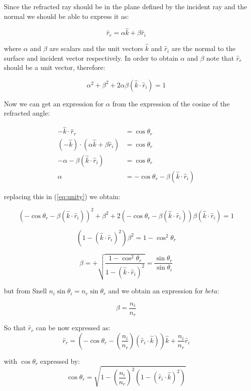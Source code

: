 \documentclass[10pt,a4paper]{article}
\begin{document}
Since the refracted ray should be in the plane defined by the incident ray and the normal we should be able to express it as:

\begin{equation}
\hat r_r = \alpha  \hat k + \beta \hat r_i
\end{equation}

where $\alpha$ and $\beta$ are scalars and the unit vectors $\hat k$ and $\hat r_i$ are the normal to the surface and incident vector respectively.
In order to obtain $\alpha$ and $\beta$ note that $\hat r_r$ should be a unit vector, therefore:

\begin{equation} \label{eq:unity}
\alpha^2 + \beta^2 + 2 \alpha \beta (\hat k \cdot \hat r_i) = 1 
\end{equation}

Now we can get an expression for $\alpha$ from the expression of the cosine of the refracted angle:

\begin{align}
-\hat k \cdot \hat r_r              & = \cos\theta_r \nonumber \\
(-\hat k)\cdot (\alpha \hat k +\beta \hat r_i)  
                                    & = \cos\theta_r \nonumber \\
-\alpha-\beta (\hat k\cdot \hat r_i)           
                                    & = \cos\theta_r \nonumber \\
\alpha                              & 
                           = -\cos\theta_r -\beta(\hat k \cdot \hat r_i) 
\end{align}

replacing this in (\ref{eq:unity}) we obtain:

\[
(- \cos\theta_r - \beta (\hat k \cdot \hat r_i))^2+ \beta^2 + 2(-\cos\theta_r-\beta(\hat k\cdot \hat r_i))\beta(\hat k \cdot \hat r_i)=1
\]

\[
(1-(\hat k\cdot \hat r_i)^2)\beta^2 = 1-\cos^2\theta_r
\]

\[
\beta = + \sqrt{\dfrac{1-\cos^2\theta_r}{1-(\hat k \cdot \hat r_i)^2}}
= \dfrac{\sin\theta_r}{\sin\theta_i}
\]


but from Snell $n_i \sin\theta_i = n_r \sin \theta_r$ and we obtain an expression for $beta$:

\begin{equation}
\beta = \dfrac{n_i}{n_r}
\end{equation}


So that $\hat r_r$ can be now expressed as:
\begin{equation}
\hat r_r = 
\left( -\cos\theta_r - \left( \dfrac{n_i}{n_r}\right) (\hat r_i \cdot \hat k) \right) \hat k + 
\dfrac{n_i}{n_r} \hat r_i
\end{equation}


with $\cos\theta_r$ expressed by:
\begin{equation}
\cos\theta_r 
     = 
\sqrt{
      1 - 
      \left(\dfrac{n_i}{n_r}\right)^2 \left(1-\left(\hat r_i \cdot \hat k\right)^2 \right)
}
\end{equation}
\end{document}
